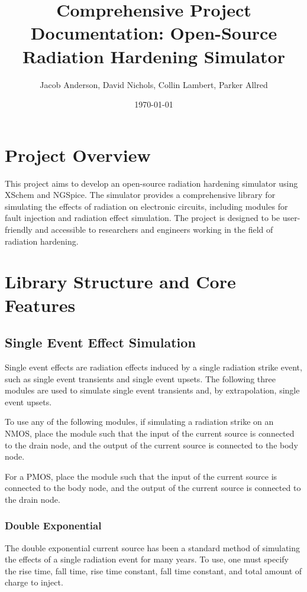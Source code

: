 \documentclass[12pt]{article}
\title{Comprehensive Project Documentation: Open-Source Radiation Hardening Simulator}
\author{Jacob Anderson, David Nichols, Collin Lambert, Parker Allred}
\date{\today}
\begin{document}
    \maketitle
    \tableofcontents
    \newpage


    \section{Project Overview}\label{sec:project-overview}
    This project aims to develop an open-source radiation hardening simulator using XSchem and NGSpice.
    The simulator provides a comprehensive library for simulating the effects of radiation on electronic circuits, including modules for fault injection and radiation effect simulation.
    The project is designed to be user-friendly and accessible to researchers and engineers working in the field of radiation hardening.


    \section{Library Structure and Core Features}\label{sec:library-structure-and-core-features}

    \subsection{Single Event Effect Simulation}\label{subsec:single-event-effect-simulation}
    Single event effects are radiation effects induced by a single radiation strike event, such as single event transients and single event upsets.
    The following three modules are used to simulate single event transients and, by extrapolation, single event upsets.

    To use any of the following modules, if simulating a radiation strike on an NMOS, place the module such that the input of the current source is connected to the drain node, and the output of the current source is connected to the body node.

    For a PMOS, place the module such that the input of the current source is connected to the body node, and the output of the current source is connected to the drain node.

    \subsubsection{Double Exponential}
    The double exponential current source has been a standard method of simulating the effects of a single radiation event for many years.
    To use, one must specify the rise time, fall time, rise time constant, fall time constant, and total amount of charge to inject.
\end{document}

